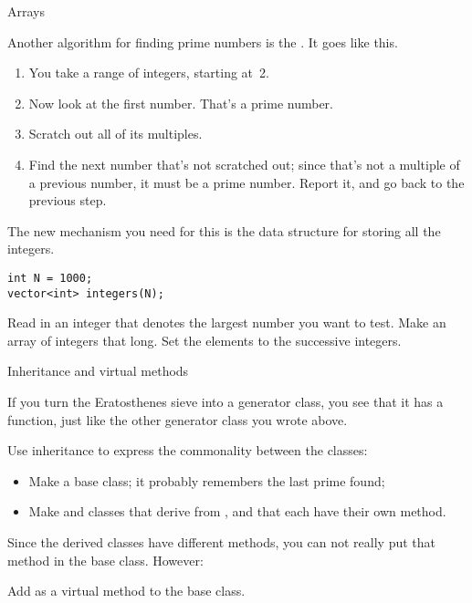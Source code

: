  {Arrays}

Another algorithm for finding prime numbers is the
. It goes like this.
\begin{enumerate}
\item You take a range of integers, starting at~2.
\item Now look at the first number. That's a prime number.
\item Scratch out all of its multiples.
\item Find the next number that's not scratched out; since that's
  not a multiple of a previous number, it must be a prime
  number. Report it, and go back to the previous step.
\end{enumerate}

The new mechanism you need for this is the data structure for storing
all the integers.
\begin{verbatim}
int N = 1000;
vector<int> integers(N);
\end{verbatim}

\begin{exercise}
  Read in an integer that denotes the largest number you want to test.
  Make an array of integers that long. Set the elements to the
  successive integers.
\end{exercise}

 {Inheritance and virtual methods}

If you turn the Eratosthenes sieve into a generator class, you see
that it has a  function, just like the other generator
class you wrote above.

\begin{exercise}
  Use inheritance to express the commonality between the classes:
  \begin{itemize}
  \item Make a  base class; it probably remembers the
    last prime found;
  \item Make  and  classes
    that derive from , and that each have their own
     method.
  \end{itemize}
\end{exercise}

Since the derived classes have different  methods, you
can not really put that method in the base class. However:

\begin{exercise}
  Add  as a virtual method to the base class.
\end{exercise}

